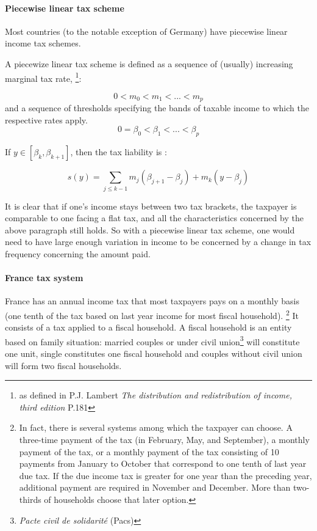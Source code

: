 \paragraph{Piecewise linear tax scheme}

Most countries (to the notable exception of Germany) have piecewise linear
income tax schemes.

A piecewize linear tax scheme is defined as a sequence of (usually) increasing
marginal tax rate, \footnote{as defined in P.J. Lambert \emph{The distribution
and redistribution of income, third edition} P.181}:%

\[
0 < m_{0} < m_{1} < ... < m_{p}
\]
and a sequence of thresholds specifying the bands of taxable income to which
the respective rates apply.
\[
0 = \beta_{0} < \beta_{1} <...< \beta_{p}
\]


If $y \in[\beta_{k}, \beta_{k+1}] $, then the tax liability is :%

\[
s(y) = \sum_{j \leq k -1} m_{j}(\beta_{j+1} - \beta_{j} ) + m_{k} (y -
\beta_{j} )
\]


It is clear that if one's income stays between two tax brackets, the taxpayer
is comparable to one facing a flat tax, and all the characteristics concerned
by the above paragraph still holds. So with a piecewise linear tax scheme, one
would need to have large enough variation in income to be concerned by a
change in tax frequency concerning the amount paid.

\paragraph{France tax system}

France has an annual income tax that most taxpayers pays on a monthly basis
(one tenth of the tax based on last year income for most fiscal household).
\footnote{In fact, there is several systems among which the taxpayer can
choose. A three-time payment of the tax (in February, May, and September), a
monthly payment of the tax, or a monthly payment of the tax consisting of 10
payments from January to October that correspond to one tenth of last year due
tax. If the due income tax is greater for one year than the preceding year,
additional payment are required in November and December. More than two-thirds
of households choose that later option.} It consists of a tax applied to a
fiscal household. A fiscal household is an entity based on family situation:
married couples or under civil union\footnote{\textit{Pacte civil de
solidarit\'{e}} (Pacs)} will constitute one unit, single constitutes one
fiscal household and couples without civil union will form two fiscal households.

